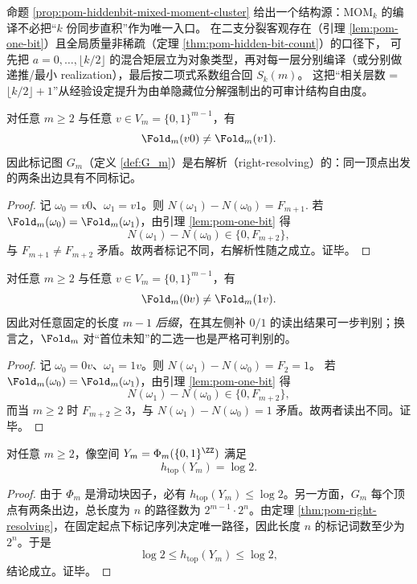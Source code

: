 \begin{remark}[含义：以混合矩簇为类型的分层编译]\label{rem:pom-hiddenbit-mixed-moment-typing}
命题 \ref{prop:pom-hiddenbit-mixed-moment-cluster} 给出一个结构源：\(\mathrm{MOM}_k\) 的编译不必把“\(k\) 份同步直积”作为唯一入口。
在二支分裂客观存在（引理 \ref{lem:pom-one-bit}）且全局质量非稀疏（定理 \ref{thm:pom-hidden-bit-count}）的口径下，
可先把 \(a=0,\dots,\lfloor k/2\rfloor\) 的混合矩层立为对象类型，再对每一层分别编译（或分别做递推/最小 realization），最后按二项式系数组合回 \(S_k(m)\)。
这把“相关层数 = \(\lfloor k/2\rfloor+1\)”从经验设定提升为由单隐藏位分解强制出的可审计结构自由度。
\end{remark}

\begin{theorem}[一步可判别与右解析性]\label{thm:pom-right-resolving}
对任意 $m\ge 2$ 与任意 $v\in V_m=\{0,1\}^{m-1}$，有
\[
\Fold_m(v0)\neq \Fold_m(v1).
\]
因此标记图 $G_m$（定义 \ref{def:G_m}）是右解析（right-resolving）的：同一顶点出发的两条出边具有不同标记。
\end{theorem}
\begin{proof}
记 $\omega_0=v0$、$\omega_1=v1$。则 $N(\omega_1)-N(\omega_0)=F_{m+1}$. 若 $\Fold_m(\omega_0)=\Fold_m(\omega_1)$，由引理 \ref{lem:pom-one-bit} 得
\[
N(\omega_1)-N(\omega_0)\in\{0,F_{m+2}\},
\]
与 $F_{m+1}\neq F_{m+2}$ 矛盾。故两者标记不同，右解析性随之成立。证毕。
\end{proof}

\begin{theorem}[一步可判别与左解析性]\label{thm:pom-left-resolving}
对任意 $m\ge 2$ 与任意 $v\in V_m=\{0,1\}^{m-1}$，有
\[
\Fold_m(0v)\neq \Fold_m(1v).
\]
因此对任意固定的长度 $m-1$ \emph{后缀}，在其左侧补 $0/1$ 的读出结果可一步判别；换言之，$\Fold_m$ 对“首位未知”的二选一也是严格可判别的。
\end{theorem}
\begin{proof}
记 $\omega_0=0v$、$\omega_1=1v$。则 $N(\omega_1)-N(\omega_0)=F_2=1$。
若 $\Fold_m(\omega_0)=\Fold_m(\omega_1)$，由引理 \ref{lem:pom-one-bit} 得
\[
N(\omega_1)-N(\omega_0)\in\{0,F_{m+2}\},
\]
而当 $m\ge 2$ 时 $F_{m+2}\ge 3$，与 $N(\omega_1)-N(\omega_0)=1$ 矛盾。故两者读出不同。证毕。
\end{proof}

\begin{theorem}\label{thm:pom-entropy-saturation}
对任意 $m\ge 2$，像空间 $Y_m=\Phi_m(\{0,1\}^{\ZZ})$ 满足
\[
h_{\mathrm{top}}(Y_m)=\log 2.
\]
\end{theorem}
\begin{proof}
由于 $\Phi_m$ 是滑动块因子，必有 $h_{\mathrm{top}}(Y_m)\le \log 2$。另一方面，$G_m$ 每个顶点有两条出边，总长度为 $n$ 的路径数为 $2^{m-1}\cdot 2^{n}$。由定理 \ref{thm:pom-right-resolving}，在固定起点下标记序列决定唯一路径，因此长度 $n$ 的标记词数至少为 $2^{n}$。于是
\[
\log 2\le h_{\mathrm{top}}(Y_m)\le \log 2,
\]
结论成立。证毕。
\end{proof}

